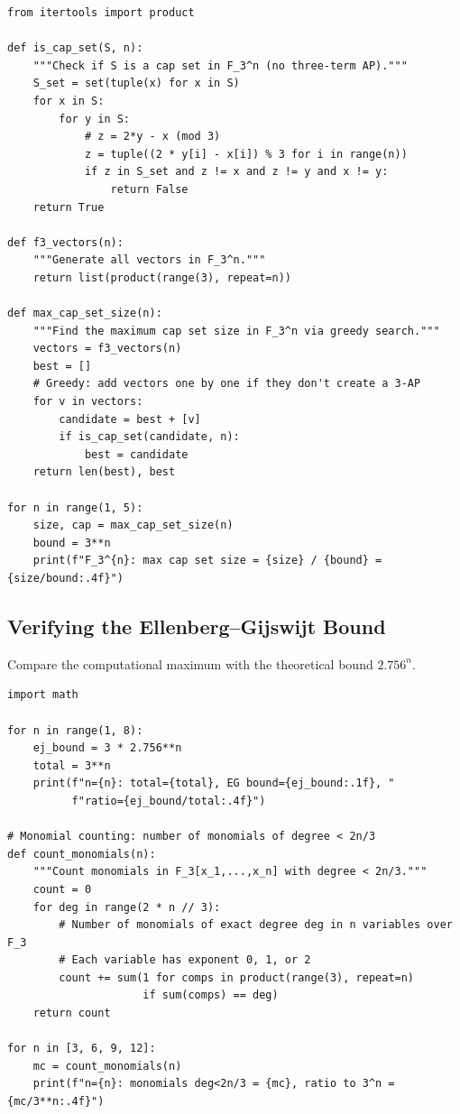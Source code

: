 \begin{verbatim}
from itertools import product

def is_cap_set(S, n):
    """Check if S is a cap set in F_3^n (no three-term AP)."""
    S_set = set(tuple(x) for x in S)
    for x in S:
        for y in S:
            # z = 2*y - x (mod 3)
            z = tuple((2 * y[i] - x[i]) % 3 for i in range(n))
            if z in S_set and z != x and z != y and x != y:
                return False
    return True

def f3_vectors(n):
    """Generate all vectors in F_3^n."""
    return list(product(range(3), repeat=n))

def max_cap_set_size(n):
    """Find the maximum cap set size in F_3^n via greedy search."""
    vectors = f3_vectors(n)
    best = []
    # Greedy: add vectors one by one if they don't create a 3-AP
    for v in vectors:
        candidate = best + [v]
        if is_cap_set(candidate, n):
            best = candidate
    return len(best), best

for n in range(1, 5):
    size, cap = max_cap_set_size(n)
    bound = 3**n
    print(f"F_3^{n}: max cap set size = {size} / {bound} = {size/bound:.4f}")
\end{verbatim}

\subsection{Verifying the Ellenberg--Gijswijt Bound}

Compare the computational maximum with the theoretical bound $2.756^n$.

\begin{verbatim}
import math

for n in range(1, 8):
    ej_bound = 3 * 2.756**n
    total = 3**n
    print(f"n={n}: total={total}, EG bound={ej_bound:.1f}, "
          f"ratio={ej_bound/total:.4f}")

# Monomial counting: number of monomials of degree < 2n/3
def count_monomials(n):
    """Count monomials in F_3[x_1,...,x_n] with degree < 2n/3."""
    count = 0
    for deg in range(2 * n // 3):
        # Number of monomials of exact degree deg in n variables over F_3
        # Each variable has exponent 0, 1, or 2
        count += sum(1 for comps in product(range(3), repeat=n)
                     if sum(comps) == deg)
    return count

for n in [3, 6, 9, 12]:
    mc = count_monomials(n)
    print(f"n={n}: monomials deg<2n/3 = {mc}, ratio to 3^n = {mc/3**n:.4f}")
\end{verbatim}

